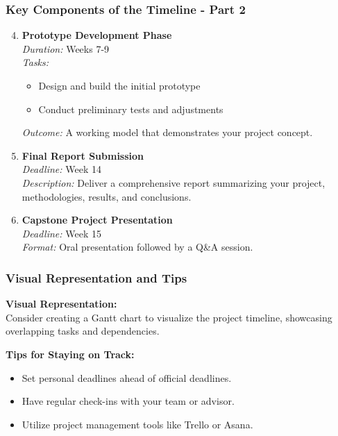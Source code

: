 \documentclass[aspectratio=169]{beamer}
\begin{document}
\begin{frame}[fragile]
    \frametitle{Key Components of the Timeline - Part 2}
    \begin{enumerate}
        \setcounter{enumi}{3}
        \item \textbf{Prototype Development Phase} \\
        \textit{Duration:} Weeks 7-9 \\
        \textit{Tasks:}
        \begin{itemize}
            \item Design and build the initial prototype
            \item Conduct preliminary tests and adjustments
        \end{itemize}
        \textit{Outcome:} A working model that demonstrates your project concept.

        \item \textbf{Final Report Submission} \\
        \textit{Deadline:} Week 14 \\
        \textit{Description:} Deliver a comprehensive report summarizing your project, methodologies, results, and conclusions.

        \item \textbf{Capstone Project Presentation} \\
        \textit{Deadline:} Week 15 \\
        \textit{Format:} Oral presentation followed by a Q\&A session.
    \end{enumerate}
\end{frame}

\begin{frame}[fragile]
    \frametitle{Visual Representation and Tips}
    \textbf{Visual Representation:} \\
    Consider creating a Gantt chart to visualize the project timeline, showcasing overlapping tasks and dependencies.

    \textbf{Tips for Staying on Track:}
    \begin{itemize}
        \item Set personal deadlines ahead of official deadlines.
        \item Have regular check-ins with your team or advisor.
        \item Utilize project management tools like Trello or Asana.
    \end{itemize}
\end{frame}
\end{document}
